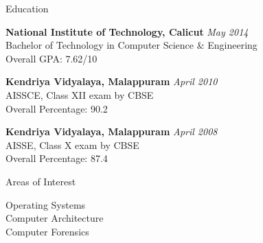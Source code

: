 \documentclass{resume} %
\begin{document}

\begin{rSection}{Education}

{\bf National Institute of Technology, Calicut} \hfill {\em May 2014} \\ 
Bachelor of Technology in Computer Science \& Engineering \\
Overall GPA: 7.62/10

{\bf Kendriya Vidyalaya, Malappuram} \hfill {\em April 2010} \\ 
AISSCE, Class XII exam by CBSE \\
Overall Percentage: 90.2

{\bf Kendriya Vidyalaya, Malappuram} \hfill {\em April 2008} \\ 
AISSE, Class X exam by CBSE \\
Overall Percentage: 87.4
\end{rSection}






\begin{rSection}{Areas of Interest}

{Operating Systems} \\
{Computer Architecture} \\
{Computer Forensics}

\end{rSection}

\end{document}
